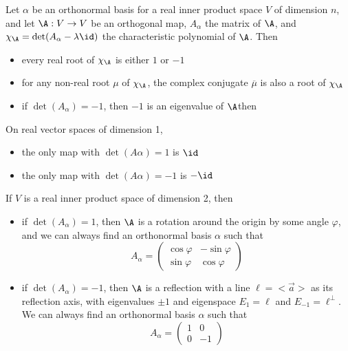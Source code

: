 \begin{theorem}
    Let $\alpha$ be an orthonormal basis for a real inner product space $V$ of dimension $n$, and let $\A: V \to V$ be
    an orthogonal map, $A_\alpha$ the matrix of $\A$, and $\chi_\A = \det(A_\alpha - \lambda\id)$ the characteristic
    polynomial of $\A$. Then
    \begin{itemize}
        \item every real root of $\chi_\A$ is either $1$ or $-1$
        \item for any non-real root $\mu$ of $\chi_\A$, the complex conjugate $\overline{\mu}$ is also a root of $\chi_\A$
        \item if $\det(A_\alpha)=-1$, then $-1$ is an eigenvalue of $\A$then 
    \end{itemize}
\end{theorem}

\begin{theorem}
    On real vector spaces of dimension 1,
    \begin{itemize}
        \item the only map with $\det(A\alpha)=1$ is $\id$
        \item the only map with $\det(A\alpha)=-1$ is $-\id$
    \end{itemize}
\end{theorem}

\begin{theorem}
    If $V$ is a real inner product space of dimension 2, then
    \begin{itemize}
        \item if $\det(A_\alpha)=1$, then $\A$ is a rotation around the origin by some angle $\varphi$, and we can
            always find an orthonormal basis $\alpha$ such that
            $$A_\alpha = \begin{pmatrix}\cos{\varphi} & -\sin{\varphi} \\ \sin{\varphi} & \cos{\varphi} \end{pmatrix}$$
        \item if $\det(A_\alpha)=-1$, then $\A$ is a reflection with a line $\ell = <\vec{a}>$ as its reflection axis, with
            eigenvalues $\pm 1$ and eigenspace $E_1 = \ell$ and $E_{-1}=\ell^\perp$. We can always find an orthonormal basis
            $\alpha$ such that
            $$A_\alpha = \begin{pmatrix} 1 & 0 \\ 0 & -1 \end{pmatrix}$$
    \end{itemize}
\end{theorem}

